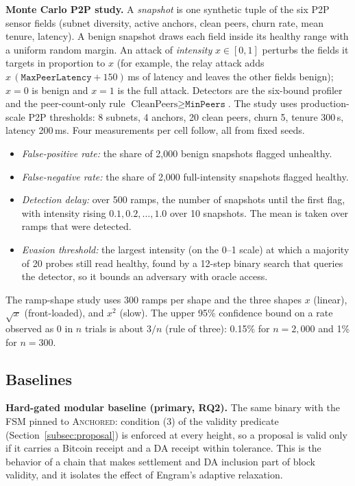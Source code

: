 \textbf{Monte Carlo P2P study.} A \emph{snapshot} is one synthetic tuple of
the six P2P sensor fields (subnet diversity, active anchors, clean peers,
churn rate, mean tenure, latency). A benign snapshot draws each field inside its healthy range
with a uniform random margin. An attack of \emph{intensity}
$x\in[0,1]$ perturbs the fields it targets in proportion to $x$ (for
example, the relay attack adds $x\,(\texttt{MaxPeerLatency}{+}150)$\,ms of
latency and leaves the other fields benign); $x=0$ is benign and $x=1$ is
the full attack. Detectors are the six-bound profiler and the
peer-count-only rule $\text{CleanPeers}\ge\texttt{MinPeers}$. The study uses
production-scale P2P thresholds: 8 subnets, 4 anchors, 20 clean peers, churn
5, tenure 300\,s, latency 200\,ms. Four measurements per cell follow, all
from fixed seeds.
\begin{itemize}
  \item \emph{False-positive rate:} the share of 2{,}000 benign snapshots
  flagged unhealthy.
  \item \emph{False-negative rate:} the share of 2{,}000 full-intensity
  snapshots flagged healthy.
  \item \emph{Detection delay:} over 500 ramps, the number of snapshots until
  the first flag, with intensity rising $0.1,0.2,\ldots,1.0$ over 10
  snapshots. The mean is taken over ramps that were detected.
  \item \emph{Evasion threshold:} the largest intensity (on the 0--1 scale)
  at which a majority of 20 probes still read healthy, found by a 12-step
  binary search that queries the detector, so it bounds an adversary with
  oracle access.
\end{itemize}
The ramp-shape study uses 300 ramps per shape and the three shapes
$x$ (linear), $\sqrt{x}$ (front-loaded), and $x^2$ (slow). The upper 95\% confidence bound on a
rate observed as 0 in $n$ trials is about $3/n$ (rule of three): 0.15\% for
$n=2{,}000$ and 1\% for $n=300$.

\subsection{Baselines}
\label{subsec:baselines}

\textbf{Hard-gated modular baseline (primary, RQ2).} The same binary with the
FSM pinned to \textsc{Anchored}: condition (3) of the validity predicate
(Section~\ref{subsec:proposal}) is enforced at every height, so a proposal
is valid only if it carries a Bitcoin receipt and a DA receipt within
tolerance. This is the behavior of a chain that makes settlement and DA
inclusion part of block validity, and it isolates the effect of Engram's
adaptive relaxation.

